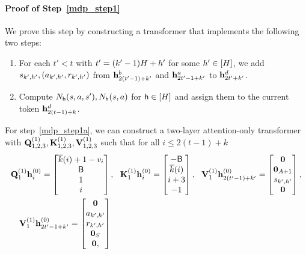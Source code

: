 \paragraph{Proof of Step~\ref{mdp_step1}} We prove this step by constructing a transformer that implements the following two steps:
\begin{enumerate}[label= Step 1\alph*, ref= 1\alph*]
    \item\label{mdp_step1a} For each $t'< t$ with $t'=(k'-1){H}+h'$ for some $h'\in[{H}]$, we add  ${s}_{k',h'},({a}_{k',h'},{r}_{k',h'})$ from  ${\mathbf h}^{b}_{2(t'-1)+k'}$ and ${\mathbf h}^{a}_{2t'-1+k'}$  to  ${\mathbf h}^{d}_{2t'+k'}$.
    \item\label{mdp_step1b} Compute ${N}_{{\mathsf{h}}}({s},{a},{s}'),{N}_{{\mathsf{h}}}({s},{a})$ for ${\mathsf{h}}\in[{H}]$ and assign them to the current token ${\mathbf h}^{d}_{2(t-1)+k}$.
\end{enumerate}
For step~\ref{mdp_step1a}, we can construct a two-layer attention-only transformer with ${\mathbf Q}^{(1)}_{1,2,3},{\mathbf K}^{(1)}_{1,2,3},{\mathbf V}^{(1)}_{1,2,3}$ such that for all $i\leq 2(t-1)+k$
\begin{align*}
&{\mathbf Q}^{(1)}_{1}{\mathbf h}^{(0)}_{i}=
\begin{bmatrix}
        \overline{k}(i)+1-{v}_{i}\\
        {\mathsf{B}}\\
        1\\
       i
    \end{bmatrix},~~ {\mathbf K}^{(1)}_{1}{\mathbf h}^{(0)}_{i}=\begin{bmatrix}
        -{\mathsf{B}}\\\overline{k}(i)\\ i+3\\-1
\end{bmatrix},~~ {\mathbf V}^{(1)}_{1}{\mathbf h}^{(0)}_{2(t'-1)+k'}=
\begin{bmatrix}
{\mathbf 0}\\{\mathbf 0}_{{A}+1}\\{s}_{k',h'}\\{\mathbf 0}\end{bmatrix},\\
&~~~
{\mathbf V}^{(1)}_{1}{\mathbf h}^{(0)}_{2t'-1+k'}=
\begin{bmatrix}
{\mathbf 0}\\{a}_{k',h'}\\
{r}_{k',h'}
\\{\mathbf 0}_{S}\\{\mathbf 0},\end{bmatrix}
\end{align*}
